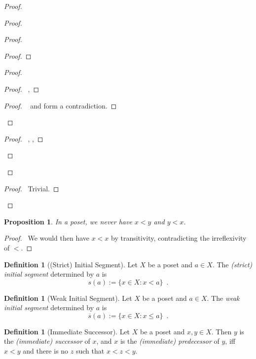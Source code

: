 \documentclass{report}
\let\qed\relax
\newtheorem{prop}[ax]{Proposition}
\theoremstyle{definition}
\newtheorem{df}[ax]{Definition}
\begin{document}
\begin{proof}
\begin{proof}
\begin{proof}
\begin{proof}
		\end{proof}
		\begin{proof}
			\begin{proof}
				\pf\ , 
			\end{proof}
			\qedstep
			\begin{proof}
				\pf\  and  form a contradiction.
			\end{proof}
		\end{proof}
		\begin{proof}
			\pf\ , , 
		\end{proof}
	\end{proof}
\end{proof}
\begin{proof}
	\pf\ Trivial.
\end{proof}
\qed
\end{proof}

\begin{prop}
\label{prop:lt_asym}
In a poset, we never have $x < y$ and $y < x$.
\end{prop}

\begin{proof}
\pf\ We would then have $x < x$ by transitivity, contradicting the irreflexivity of $<$. \qed
\end{proof}

\begin{df}[(Strict) Initial Segment]
Let $X$ be a poset and $a \in X$. The \emph{(strict) initial segment} determined by $a$ is
\[ s(a) := \{ x \in X : x < a \} \enspace . \]
\end{df}

\begin{df}[Weak Initial Segment]
Let $X$ be a poset and $a \in X$. The \emph{weak initial segment} determined by $a$ is
\[ \overline{s}(a) := \{ x \in X : x \leq a \} \enspace . \]
\end{df}

\begin{df}[Immediate Successor]
Let $X$ be a poset and $x,y \in X$. Then $y$ is the \emph{(immediate) successor} of $x$, and $x$ is the \emph{(immediate) predecessor} of $y$, iff $x < y$ and there is no $z$ such that $x < z < y$.
\end{df}
\end{document}
